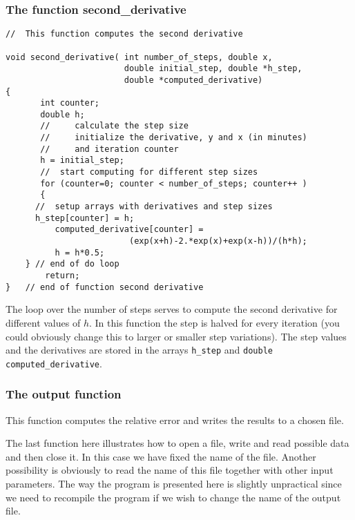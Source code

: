 \subsubsection{The function second\_derivative}

\begin{lstlisting}
//  This function computes the second derivative 

void second_derivative( int number_of_steps, double x, 
                        double initial_step, double *h_step, 
                        double *computed_derivative)
{
       int counter;
       double h;
       //     calculate the step size  
       //     initialize the derivative, y and x (in minutes) 
       //     and iteration counter 
       h = initial_step;
       //  start computing for different step sizes 
       for (counter=0; counter < number_of_steps; counter++ )  
       {
	  //  setup arrays with derivatives and step sizes
	  h_step[counter] = h;
          computed_derivative[counter] = 
                         (exp(x+h)-2.*exp(x)+exp(x-h))/(h*h);
          h = h*0.5;
	} // end of do loop 
        return;
}   // end of function second derivative 
\end{lstlisting}
The loop over the number of steps serves to compute the 
second derivative 
for different values of $h$. In this function the step is halved
for every iteration (you could obviously change this to larger or smaller step variations). 
The step values and the derivatives are stored
in the arrays 
\verb?h_step? and  \verb?double computed_derivative?.
\subsubsection{The output function}
This function computes the relative error and writes the results to a chosen
file.

The last function here illustrates how to open a file, write and read possible
data and then close it. In this case we have fixed the name of the file.
Another possibility is obviously to read the name of this file together
with other input parameters. The way the program is presented here is 
slightly unpractical since we need to recompile the program if we wish
to change the name of the output file.

